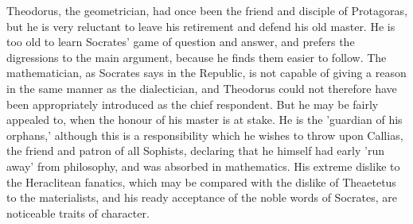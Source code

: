 \documentclass[11pt,letter]{article}
\begin{document}
\par  Theodorus, the geometrician, had once been the friend and disciple of Protagoras, but he is very reluctant to leave his retirement and defend his old master. He is too old to learn Socrates' game of question and answer, and prefers the digressions to the main argument, because he finds them easier to follow. The mathematician, as Socrates says in the Republic, is not capable of giving a reason in the same manner as the dialectician, and Theodorus could not therefore have been appropriately introduced as the chief respondent. But he may be fairly appealed to, when the honour of his master is at stake. He is the 'guardian of his orphans,' although this is a responsibility which he wishes to throw upon Callias, the friend and patron of all Sophists, declaring that he himself had early 'run away' from philosophy, and was absorbed in mathematics. His extreme dislike to the Heraclitean fanatics, which may be compared with the dislike of Theaetetus to the materialists, and his ready acceptance of the noble words of Socrates, are noticeable traits of character.
\end{document}
